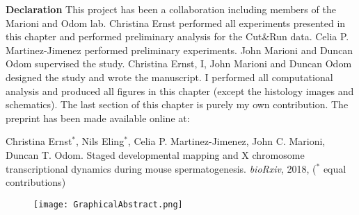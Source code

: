 \vspace*{\fill}

\newpage

\vspace*{\fill}

\begin{Comment}
\textbf{Declaration} This project has been a collaboration including members of the Marioni and Odom lab. Christina Ernst performed all experiments presented in this chapter and performed preliminary analysis for the Cut\&{}Run data. Celia P. Martinez-Jimenez performed preliminary experiments. John Marioni and Duncan Odom supervised the study. Christina Ernst, I, John Marioni and Duncan Odom designed the study and wrote the manuscript. I performed all computational analysis and produced all figures in this chapter (except the histology images and schematics). The last section of this chapter is purely my own contribution. The preprint has been made available online at:

Christina Ernst$^\ast$, Nils Eling$^\ast$, Celia P. Martinez-Jimenez, John C. Marioni, Duncan T. Odom. Staged developmental mapping and X chromosome transcriptional dynamics during mouse spermatogenesis. \emph{bioRxiv}, 2018, ($^\ast$ equal contributions)
\end{Comment}

\vspace*{\fill}

\begin{figure}[hb]
\centering    
\texttt{[image: GraphicalAbstract.png]}
\caption*{}
\end{figure}

\vspace*{\fill}


\newpage


\newpage


